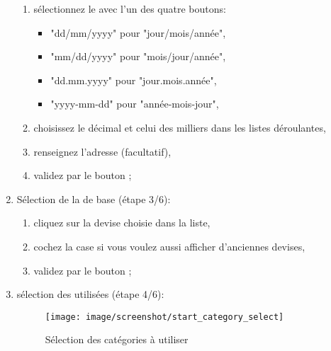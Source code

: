 \begin{enumerate}
		\begin{enumerate}[resume]		%
			\item sélectionnez le  avec l'un des quatre boutons:
				\begin{itemize}	
				\item[\textopenbullet] "dd/mm/yyyy" pour "jour/mois/année",
				\item[\textopenbullet] "mm/dd/yyyy" pour "mois/jour/année",
				\item[\textopenbullet] "dd.mm.yyyy" pour "jour.mois.année",
				\item[\textopenbullet] "yyyy-mm-dd" pour "année-mois-jour",
				\end{itemize}
			\item choisissez le  décimal et celui des milliers dans les listes déroulantes,
			\item renseignez l'adresse (facultatif),
			\item validez par le bouton ;
		\end{enumerate}
		
	\item Sélection de la  de base (étape 3/6):
		\begin{enumerate} 
		 	\item cliquez sur la devise choisie dans la liste,
			\item cochez la case  si vous voulez aussi afficher d'anciennes devises,
			\item validez par le bouton ;
		\end{enumerate}

	\item sélection des  utilisées (étape 4/6):
	
	\begin{figure}[htbp]
	\begin{center}
		\texttt{[image: image/screenshot/start\_category\_select]}
	\end{center}
	\caption{Sélection des catégories à utiliser}
	\label{start_category_select}
	\end{figure}
		

\end{enumerate}
